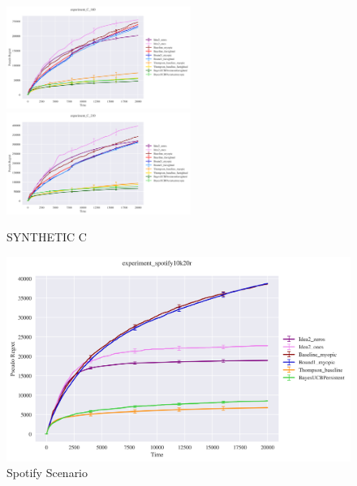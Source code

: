 \begin{figure}
	\includegraphics[width=6cm]{./images/C/experiment_C_160 ANALYTICS.png}\quad\includegraphics[width=6cm]{./images/C/experiment_C_210 ANALYTICS.png}
	\caption{SYNTHETIC C}
	
\end{figure}



\begin{figure}[h]
	\includegraphics[width=16cm]{./images/experiment_spotify10k20r ANALYTICS.png}
	\centering	
	\caption{Spotify Scenario}
\end{figure}


